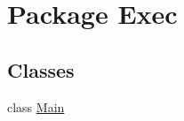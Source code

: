 \hypertarget{namespace_exec}{
\section{Package Exec}
\label{namespace_exec}
}
\subsection*{Classes}
\begin{DoxyCompactItemize}
\item 
class \hyperlink{class_exec_1_1_main}{Main}
\end{DoxyCompactItemize}
